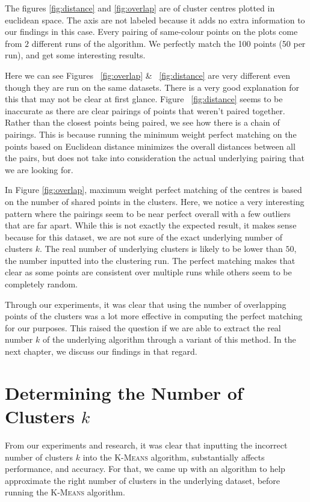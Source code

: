 \documentclass[12pt]{dalthesis}
\newcommand*{\kmeans}{\textsc{K-Means} } %
\begin{document}
The figures \ref{fig:distance} and \ref{fig:overlap} are of cluster centres plotted in euclidean space. The axis are not labeled because it adds no extra information to our findings in this case. Every pairing of same-colour points on the plots come from $2$ different runs of the algorithm. We perfectly match the 100 points (50 per run), and get some interesting results.

Here we can see Figures ~\ref{fig:overlap} \& ~\ref{fig:distance} are very different even though they are run on the same datasets. There is a very good explanation for this that may not be clear at first glance. Figure ~\ref{fig:distance} seems to be inaccurate as there are clear pairings of points that weren't paired together. Rather than the closest points being paired, we see how there is a chain of pairings. This is because running the minimum weight perfect matching on the points based on Euclidean distance minimizes the overall distances between all the pairs, but does not take into consideration the actual underlying pairing that we are looking for.

In Figure \ref{fig:overlap}, maximum weight perfect matching of the centres is based on the number of shared points in the clusters. Here, we notice a very interesting pattern where the pairings seem to be near perfect overall with a few outliers that are far apart. While this is not exactly the expected result, it makes sense because for this dataset, we are not sure of the exact underlying number of clusters $k$. The real number of underlying clusters is likely to be lower than  $50$, the number inputted into the clustering run. The perfect matching makes that clear as some points are consistent over multiple runs while others seem to be completely random.

Through our experiments, it was clear that using the number of overlapping points of the clusters was a lot more effective in computing the perfect matching for our purposes. This raised the question if we are able to extract the real number $k$ of the underlying algorithm through a variant of this method. In the next chapter, we discuss our findings in that regard. 

\chapter{Determining the Number of Clusters $k$}
From our experiments and research, it was clear that inputting the incorrect number of clusters $k$ into the \kmeans algorithm, substantially affects performance, and accuracy. For that, we came up with an algorithm to help approximate the right number of clusters in the underlying dataset, before running the \kmeans algorithm.
\end{document}
